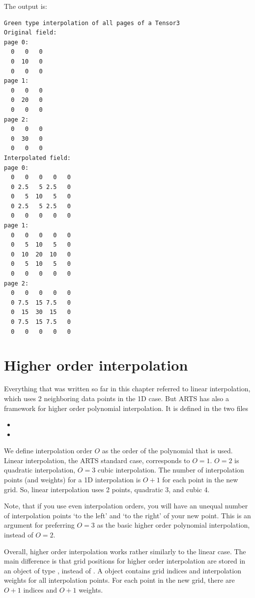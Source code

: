 \hspace{-\parindent}The output is:

{\small
\begin{verbatim}
Green type interpolation of all pages of a Tensor3
Original field:
page 0:
  0   0   0
  0  10   0
  0   0   0
page 1:
  0   0   0
  0  20   0
  0   0   0
page 2:
  0   0   0
  0  30   0
  0   0   0
Interpolated field:
page 0:
  0   0   0   0   0
  0 2.5   5 2.5   0
  0   5  10   5   0
  0 2.5   5 2.5   0
  0   0   0   0   0
page 1:
  0   0   0   0   0
  0   5  10   5   0
  0  10  20  10   0
  0   5  10   5   0
  0   0   0   0   0
page 2:
  0   0   0   0   0
  0 7.5  15 7.5   0
  0  15  30  15   0
  0 7.5  15 7.5   0
  0   0   0   0   0
\end{verbatim}
}


\section{Higher order interpolation}

Everything that was written so far in this chapter referred to linear
interpolation, which uses 2 neighboring data points in the 1D
case. But ARTS has also a framework for higher order polynomial
interpolation. It is defined in the two files

\begin{itemize}
\item {}
\item {}
\end{itemize}

We define interpolation order $O$ as the order of the polynomial that
is used. Linear interpolation, the ARTS standard case, corresponds to
$O=1$. $O=2$ is quadratic interpolation, $O=3$ cubic interpolation.
The number of interpolation points (and weights) for a 1D
interpolation is $O+1$ for each point in the new grid. So, linear
interpolation uses 2 points, quadratic 3, and cubic 4.

Note, that if you use even interpolation orders, you will have an
unequal number of interpolation points `to the left' and `to the
right' of your new point. This is an argument for preferring $O=3$ as the
basic higher order polynomial interpolation, instead of $O=2$.

Overall, higher order interpolation works rather similarly to the
linear case.  The main difference is that grid positions for higher
order interpolation are stored in an object of type
, instead of . A
 object contains grid indices and interpolation
weights for all interpolation points. For each point in the new grid,
there are $O+1$ indices and $O+1$ weights.

